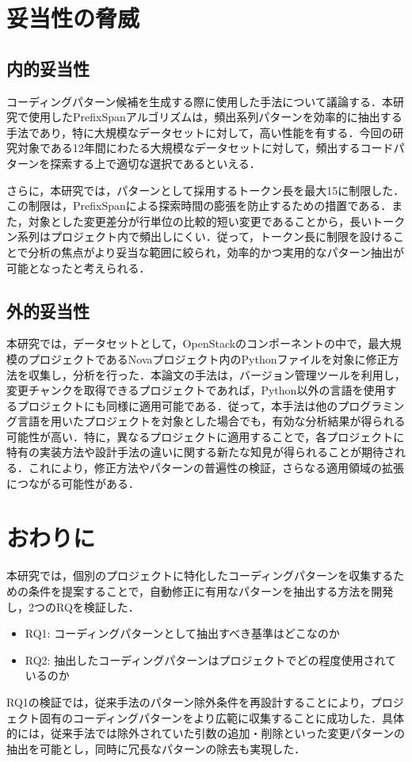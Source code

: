 \documentclass[11pt]{jreport}
\newcommand{\RQone}{コーディングパターンとして抽出すべき基準はどこなのか}
\newcommand{\RQtwo}{抽出したコーディングパターンはプロジェクトでどの程度使用されているのか}
\begin{document}
\chapter{妥当性の脅威}
\section{内的妥当性}
コーディングパターン候補を生成する際に使用した手法について議論する．本研究で使用したPrefixSpanアルゴリズムは，頻出系列パターンを効率的に抽出する手法であり，特に大規模なデータセットに対して，高い性能を有する．今回の研究対象である12年間にわたる大規模なデータセットに対して，頻出するコードパターンを探索する上で適切な選択であるといえる．

さらに，本研究では，パターンとして採用するトークン長を最大15に制限した．この制限は，PrefixSpanによる探索時間の膨張を防止するための措置である．また，対象とした変更差分が行単位の比較的短い変更であることから，長いトークン系列はプロジェクト内で頻出しにくい．従って，トークン長に制限を設けることで分析の焦点がより妥当な範囲に絞られ，効率的かつ実用的なパターン抽出が可能となったと考えられる．
\section{外的妥当性}
本研究では，データセットとして，OpenStackのコンポーネントの中で，最大規模のプロジェクトであるNovaプロジェクト内のPythonファイルを対象に修正方法を収集し，分析を行った．本論文の手法は，バージョン管理ツールを利用し，変更チャンクを取得できるプロジェクトであれば，Python以外の言語を使用するプロジェクトにも同様に適用可能である．従って，本手法は他のプログラミング言語を用いたプロジェクトを対象とした場合でも，有効な分析結果が得られる可能性が高い．特に，異なるプロジェクトに適用することで，各プロジェクトに特有の実装方法や設計手法の違いに関する新たな知見が得られることが期待される．これにより，修正方法やパターンの普遍性の検証，さらなる適用領域の拡張につながる可能性がある．
\chapter{おわりに}
本研究では，個別のプロジェクトに特化したコーディングパターンを収集するための条件を提案することで，自動修正に有用なパターンを抽出する方法を開発し，2つのRQを検証した．
\begin{itemize}
    \item RQ1: \RQone
    \item RQ2: \RQtwo
\end{itemize}
RQ1の検証では，従来手法のパターン除外条件を再設計することにより，プロジェクト固有のコーディングパターンをより広範に収集することに成功した．具体的には，従来手法では除外されていた引数の追加・削除といった変更パターンの抽出を可能とし，同時に冗長なパターンの除去も実現した．
\end{document}
